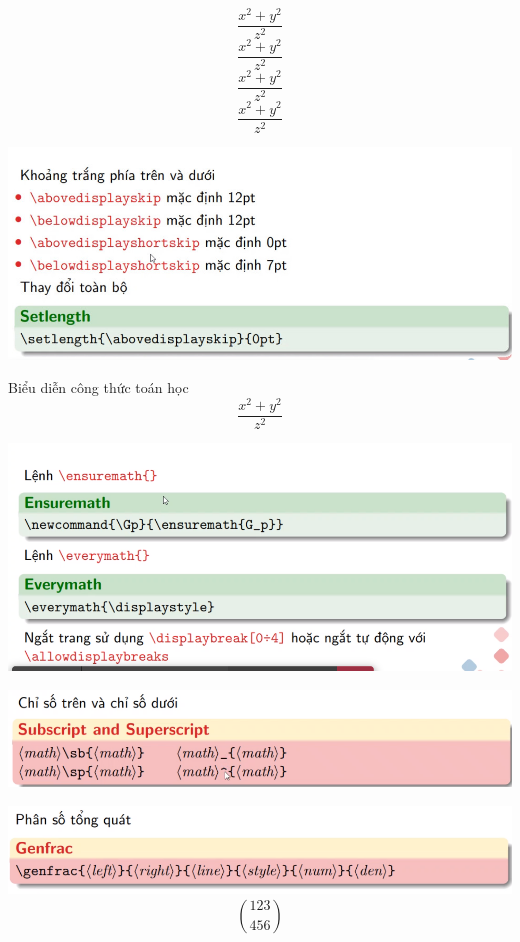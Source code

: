 \documentclass{article}
\begin{document}
$$\frac{x^2+y^2}{z^2}$$
$$\textstyle\frac{x^2+y^2}{z^2}$$
$$\scriptstyle\frac{x^2+y^2}{z^2}$$
$$\scriptscriptstyle\frac{x^2+y^2}{z^2}$$

\includegraphics[scale=0.3]{image/khoang-trang.jpg}

Biểu diễn công thức toán học
\abovedisplayskip=20pt
$$\displaystyle \frac{x^2+y^2}{z^2}$$

\includegraphics[scale=0.6]{image/ensuremth.png}

\newpage

\includegraphics[scale=0.6]{image/subscript.png}

\vspace{1cm}

\includegraphics[scale=0.6]{image/genfrac.png}
$$\genfrac{(}{)}{0pt}{}{123}{456}$$
\end{document}
